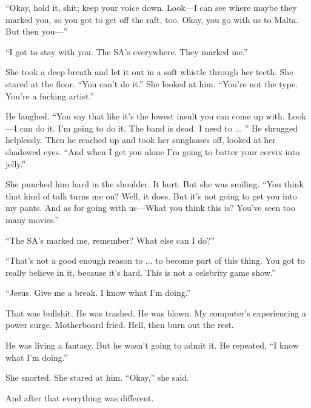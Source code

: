 ``Okay, hold it, shit; keep your voice down. Look—I can see where maybe they marked you, so you got to get off the raft, too. Okay, you go with us to Malta. But then you—''

``I got to stay with you. The SA's everywhere. They marked me.''

She took a deep breath and let it out in a soft whistle through her teeth. She stared at the floor. ``You can't do it.'' She looked at him. ``You're not the type. You're a fucking artist.''

He laughed. ``You say that like it's the lowest insult you can come up with. Look—I can do it. I'm going to do it. The band is dead. I need to ... '' He shrugged helplessly. Then he reached up and took her sunglasses off, looked at her shadowed eyes. ``And when I get you alone I'm going to batter your cervix into jelly.''

She punched him hard in the shoulder. It hurt. But she was smiling. ``You think that kind of talk turns me on? Well, it does. But it's not going to get you into my pants. And as for going with us—What you think this is? You've seen too many movies.''

``The SA's marked me, remember? What else can I do?''

``That's not a good enough reason to ... to become part of this thing. You got to really believe in it, because it's hard. This is not a celebrity game show.''

``Jesus. Give me a break. I know what I'm doing.''

That was bullshit. He was trashed. He was blown. My computer's experiencing a power surge. Motherboard fried. Hell, then burn out the rest.

He was living a fantasy. But he wasn't going to admit it. He repeated, ``I know what I'm doing.''

She snorted. She stared at him. ``Okay,'' she said.

And after that everything was different.